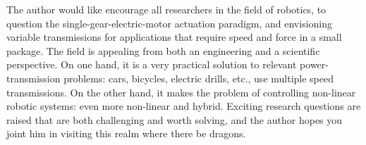 The author would like encourage all researchers in the field of robotics, to question the single-gear-electric-motor actuation paradigm, and envisioning variable transmissions for applications that require speed and force in a small package. The field is appealing from both an engineering and a scientific perspective. On one hand, it is a very practical solution to relevant power-transmission problems: cars, bicycles, electric drills, etc., use multiple speed transmissions. On the other hand, it makes the problem of controlling non-linear robotic systems: even more non-linear and hybrid. Exciting research questions are raised that are both challenging and worth solving, and the author hopes you joint him in visiting this realm where there be dragons.






